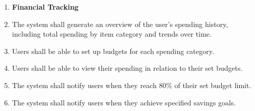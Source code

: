 \documentclass[12pt]{article}
\begin{document}
\begin{enumerate}[label=FR\arabic*]
  \item[] \textbf{Financial Tracking}
  \item The system shall generate an overview of the user's spending history,
  including total spending by item category and trends over time.
  \item Users shall be able to set up budgets for each spending category.
  \item Users shall be able to view their spending in relation to their set
  budgets.
  \item The system shall notify users when they reach 80\% of their set budget
  limit.
  \item The system shall notify users when they achieve specified savings goals.
\end{enumerate}

\newpage
\end{document}
